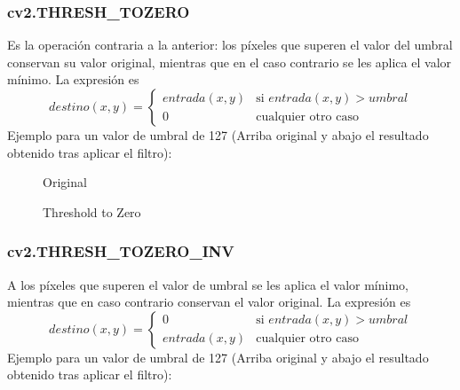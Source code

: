 \subsubsection{cv2.THRESH\_TOZERO}
Es la operación contraria a la anterior: los píxeles que superen el
valor del umbral conservan su valor original, mientras que en el caso
contrario se les aplica el valor mínimo. La expresión es
\begin{equation*}
  destino(x, y) =
  \begin{cases}
    entrada(x, y) & \text{si } entrada(x, y) > umbral \\
    0 & \text{cualquier otro caso}
  \end{cases}
\end{equation*}
Ejemplo para un valor de umbral de 127 (Arriba original y abajo el
resultado obtenido tras aplicar el filtro):

\begin{figure}[H]
  \caption{Original}
  \centering \setlength\fboxsep{0pt} \setlength\fboxrule{0.5pt}
\end{figure}

\begin{figure}[H]
  \centering \setlength\fboxsep{0pt} \setlength\fboxrule{0.5pt}
  \caption{Threshold to Zero}
\end{figure}

\subsubsection{cv2.THRESH\_TOZERO\_INV}
A los píxeles que superen el valor de umbral se les aplica el valor
mínimo, mientras que en caso contrario conservan el valor original. La
expresión es
\begin{equation*}
  destino(x, y) =
  \begin{cases}
    0  & \text{si } entrada(x, y) > umbral \\
    entrada(x, y) & \text{cualquier otro caso}
  \end{cases}
\end{equation*}
Ejemplo para un valor de umbral de 127 (Arriba original y abajo el
resultado obtenido tras aplicar el filtro):

